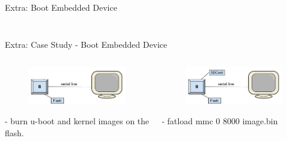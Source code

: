 \documentclass{workshop}
\begin{document}
\begin{frame}{Extra: Boot Embedded Device}
\begin{columns}
\begin{column}[l]{0.45\textwidth}
\begin{figure}
      \end{figure}
    \end{column}
  \end{columns}
\end{frame}

\begin{frame}{Extra: Case Study - Boot Embedded Device}
  \begin{columns}
    \pause
    \begin{column}[l]{0.45\textwidth}
      \begin{figure}
         \includegraphics[scale=0.17]{img/flash.png}
      \end{figure}
      \begin{center}
        \tiny{- burn u-boot and kernel images on the flash.}
      \end{center}
    \end{column}
    \pause
    \begin{column}[l]{0.45\textwidth}
      \begin{figure}
         \includegraphics[scale=0.17]{img/sdcard.png}
      \end{figure}
      \begin{center}
        \tiny{- fatload mmc 0 8000 image.bin}
      \end{center}
    \end{column}
  \end{columns}
     \pause
     \begin{figure}

\end{figure}
\end{frame}
\end{document}
